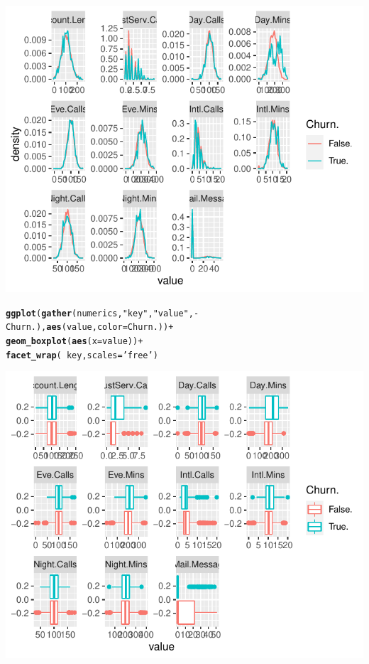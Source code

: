 \documentclass{article}\usepackage[]{graphicx}\usepackage[]{color}
\makeatletter
\def\maxwidth{ %
  \ifdim\Gin@nat@width>\linewidth
    \linewidth
  \else
    \Gin@nat@width
  \fi
}
\newcommand{\hlstr}[1]{\textcolor[rgb]{0.192,0.494,0.8}{#1}}%
\newcommand{\hlopt}[1]{\textcolor[rgb]{0,0,0}{#1}}%
\newcommand{\hlstd}[1]{\textcolor[rgb]{0.345,0.345,0.345}{#1}}%
\newcommand{\hlkwc}[1]{\textcolor[rgb]{0.333,0.667,0.333}{#1}}%
\newcommand{\hlkwd}[1]{\textcolor[rgb]{0.737,0.353,0.396}{\textbf{#1}}}%
\newenvironment{kframe}{%
 \def\at@end@of@kframe{}%
 \ifinner\ifhmode%
  \def\at@end@of@kframe{\end{minipage}}%
  \begin{minipage}{\columnwidth}%
 \fi\fi%
 \def\FrameCommand##1{\hskip\@totalleftmargin \hskip-\fboxsep
 \colorbox{shadecolor}{##1}\hskip-\fboxsep
     \hskip-\linewidth \hskip-\@totalleftmargin \hskip\columnwidth}%
 \MakeFramed {\advance\hsize-\width
   \@totalleftmargin\z@ \linewidth\hsize
   \@setminipage}}%
 {\par\unskip\endMakeFramed%
 \at@end@of@kframe}
\newenvironment{knitrout}{}{} %
\makeatother
\begin{document}
\begin{description}
\begin{knitrout}
\includegraphics[width=\maxwidth]{figure/Overviews_plots_grouped-2} 
\begin{kframe}\begin{alltt}
\hlkwd{ggplot}\hlstd{(}\hlkwd{gather}\hlstd{(numerics,} \hlstr{"key"}\hlstd{,} \hlstr{"value"}\hlstd{,} \hlopt{-}\hlstd{Churn.),} \hlkwd{aes}\hlstd{(value,} \hlkwc{color}\hlstd{=Churn.))} \hlopt{+}
  \hlkwd{geom_boxplot}\hlstd{(}\hlkwd{aes}\hlstd{(}\hlkwc{x}\hlstd{=value))} \hlopt{+}
  \hlkwd{facet_wrap}\hlstd{(}\hlopt{~}\hlstd{key,} \hlkwc{scales}\hlstd{=}\hlstr{'free'}\hlstd{)}
\end{alltt}
\end{kframe}
\includegraphics[width=\maxwidth]{figure/Overviews_plots_grouped-3} 


\end{knitrout}
\end{description}
\end{document}
